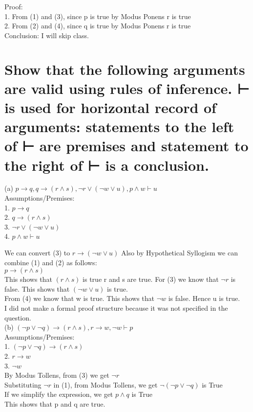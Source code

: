 \documentclass{article}
\begin{document}
 Proof:\\
 1. From (1) and (3), since p is true by Modus Ponens r is true\\
 2. From (2) and (4), since q is true by Modus Ponens r is true\\


 Conclusion: I will skip class.\\

 \section{Show that the following arguments are valid using rules of inference. ⊢ is used for horizontal
record of arguments: statements to the left of ⊢ are premises and statement to the right of ⊢ is
a conclusion.}

\Large (a) $p \rightarrow q, q \rightarrow (r \land s), \neg r \lor (\neg w \lor u), p \land w \vdash u$\\

Assumptions/Premises:\\
1. $p \rightarrow q$\\
2. $q \rightarrow (r \land s)$\\
3. $ \neg r \lor (\neg w \lor u)$\\
4. $p \land w \vdash u$

We can convert (3) to $r \rightarrow (\neg w \lor u)$ 
Also by Hypothetical Syllogism we can combine (1) and (2) as follows:\\
$p \rightarrow (r \land s)$\\
This shows that $(r \land s)$ is true r and s are true.
For (3) we know that $\neg r $ is false. This shows that $(\neg w \lor u)$ is true.\\
From (4) we know that w is true. This shows that $\neg w $ is false. Hence u is true. 
\\
I did not make a formal proof structure because it was not specified in the question.
\\

\Large (b) $(\neg p \lor \neg q) \rightarrow (r \land s), r \rightarrow w, \neg w \vdash p$
\\

Assumptions/Premises:\\
1. $(\neg p \lor \neg q) \rightarrow (r \land s)$\\
2. $r \rightarrow w$\\
3. $ \neg w $\\

By Modus Tollens, from (3) we get $\neg r$\\
Substituting $\neg r $ in (1), from Modus Tollens, we get $\neg(\neg p \lor \neg q) $ is True \\
If we simplify the expression, we get $p \land q$ is True\\
This shows that p and q are true.\\
\end{document}
